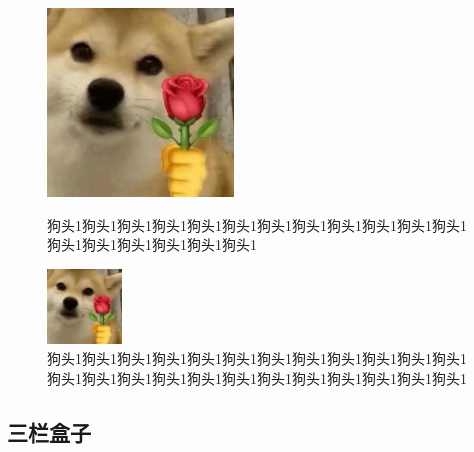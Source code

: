 \documentclass[normalsize]{article}   %
\begin{document}
		\begin{figure}[htbp!]
			\begin{minipage}{0.5\linewidth}
				\centering    %
				\includegraphics[height=5cm]{img/sample.png}
				\caption{狗头1狗头1狗头1狗头1狗头1狗头1狗头1狗头1狗头1狗头1狗头1狗头1狗头1狗头1狗头1狗头1狗头1狗头1}
				\label{fig:1}  %
			\end{minipage}
			\begin{minipage}{0.5\linewidth}
				\centering
				\includegraphics[height=2cm]{img/sample.png}
				\caption{狗头1狗头1狗头1狗头1狗头1狗头1狗头1狗头1狗头1狗头1狗头1狗头1狗头1狗头1狗头1狗头1狗头1狗头1狗头1狗头1狗头1狗头1狗头1狗头1}
\label{fig:1}  %
			\end{minipage}
		\end{figure}
	
		\subsection{三栏盒子}
		
\end{document}
